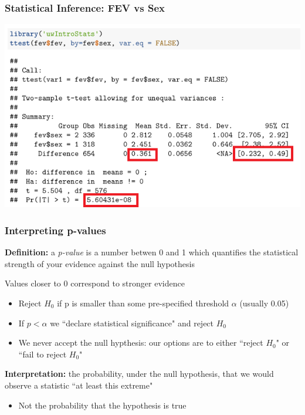 \documentclass[12pt, 
hyperref={colorlinks=true, linkcolor=blue, urlcolor=cyan}]{beamer}
\begin{document}
\begin{frame}
\frametitle{Statistical Inference: FEV vs Sex}

\hspace*{-1cm} \includegraphics[width=\paperwidth]{./t-test-highlights}

\end{frame}

\begin{frame}
\frametitle{Interpreting p-values}

\textbf{Definition:} a \textit{p-value} is a number betwen 0 and 1 which quantifies the statistical strength of your evidence against the null hypothesis

Values closer to 0 correspond to stronger evidence\vspace{-0.3cm}
	\begin{itemize}
	\item Reject $H_0$ if p is smaller than some pre-specified threshold $\alpha$ (usually 0.05)
	\item If $p < \alpha$ we ``declare statistical significance" and reject $H_0$
	\item \color{red} We never accept the null hypthesis: \color{black} our options are to either ``reject $H_0$" or ``fail to reject $H_0$"
	\end{itemize}
\textbf{Interpretation:} the probability, under the null hypothesis, that we would observe a statistic ``at least this extreme"\vspace{-0.3cm}
	\begin{itemize}
	\item \color{red} Not \color{black} the probability that the hypothesis is true
	\end{itemize}

\end{frame}
\end{document}
